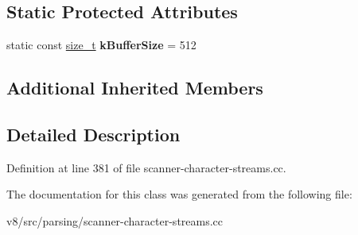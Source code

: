 \subsection*{Static Protected Attributes}
\begin{DoxyCompactItemize}
\item 
\mbox{\label{classv8_1_1internal_1_1BufferedUtf16CharacterStream_a6c0a37f0a5fb8c2806476c3db3acb84f}} 
static const \mbox{\hyperlink{classsize__t}{size\+\_\+t}} {\bfseries k\+Buffer\+Size} = 512
\end{DoxyCompactItemize}
\subsection*{Additional Inherited Members}


\subsection{Detailed Description}


Definition at line 381 of file scanner-\/character-\/streams.\+cc.



The documentation for this class was generated from the following file\+:\begin{DoxyCompactItemize}
\item 
v8/src/parsing/scanner-\/character-\/streams.\+cc\end{DoxyCompactItemize}
